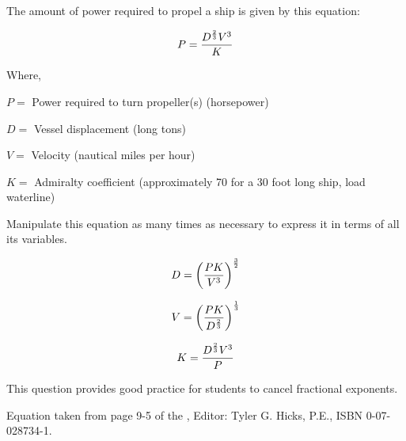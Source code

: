 

The amount of power required to propel a ship is given by this equation:

$$P = {D^{2 \over 3} V^3 \over K}$$

\noindent
Where,

$P =$ Power required to turn propeller(s) (horsepower)

$D =$ Vessel displacement (long tons)

$V =$ Velocity (nautical miles per hour)

$K =$ Admiralty coefficient (approximately 70 for a 30 foot long ship, load waterline)

\vskip 10pt

Manipulate this equation as many times as necessary to express it in terms of all its variables.







$$D = \biggl({P K \over V^3} \biggr)^{3 \over 2}$$

\vskip 20pt

$$V = \biggl({P K \over D^{2 \over 3}} \biggr)^{1 \over 3}$$

\vskip 20pt

$$K = {D^{2 \over 3} V^3 \over P}$$







This question provides good practice for students to cancel fractional exponents.

\vskip 10pt

Equation taken from page 9-5 of the , Editor: Tyler G. Hicks, P.E., ISBN 0-07-028734-1.





